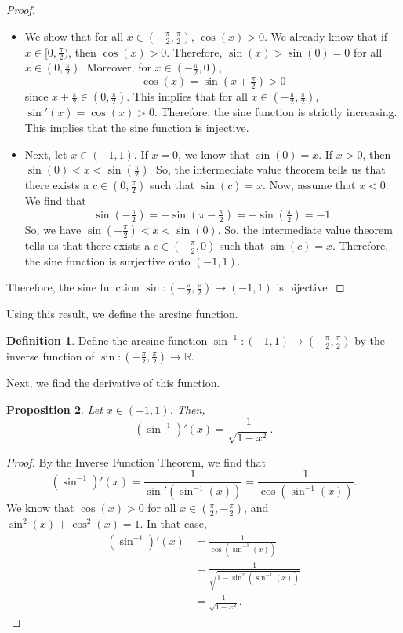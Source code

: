 \documentclass[a4paper, openany]{memoir}
\theoremstyle{definition}
\newtheorem{definition}{Definition}[section]
\theoremstyle{plain}
\newtheorem{proposition}[definition]{Proposition}
\begin{document}
\begin{proof}
\hspace*{0pt}
\begin{itemize}
    \item We show that for all $x \in (-\frac{\pi}{2}, \frac{\pi}{2})$, $\cos(x) > 0$. We already know that if $x \in [0, \frac{\pi}{2})$, then $\cos (x) > 0$. Therefore, $\sin(x) > \sin(0) = 0$ for all $x \in (0, \frac{\pi}{2})$. Moreover, for $x \in (-\frac{\pi}{2}, 0)$,
    \[\cos (x) = \sin(x + \tfrac{\pi}{2}) > 0\]
    since $x + \frac{\pi}{2} \in (0, \frac{\pi}{2})$. This implies that for all $x \in (-\frac{\pi}{2}, \frac{\pi}{2})$, $\sin'(x) = \cos (x) > 0$. Therefore, the sine function is strictly increasing. This implies that the sine function is injective.
    
    \item Next, let $x \in (-1, 1)$. If $x = 0$, we know that $\sin(0) = x$. If $x > 0$, then $\sin(0) < x < \sin(\frac{\pi}{2})$. So, the intermediate value theorem tells us that there exists a $c \in (0, \frac{\pi}{2})$ such that $\sin(c) = x$. Now, assume that $x < 0$. We find that
    \[\sin(-\tfrac{\pi}{2}) = -\sin(\pi - \tfrac{\pi}{2}) = -\sin(\tfrac{\pi}{2}) = -1.\]
    So, we have $\sin(-\frac{\pi}{2}) < x < \sin(0)$. So, the intermediate value theorem tells us that there exists a $c \in (-\frac{\pi}{2}, 0)$ such that $\sin(c) = x$. Therefore, the sine function is surjective onto $(-1, 1)$.
\end{itemize}
Therefore, the sine function $\sin: (-\frac{\pi}{2}, \frac{\pi}{2}) \to (-1, 1)$ is bijective.
\end{proof}
\noindent Using this result, we define the arcsine function.
\begin{definition}
Define the arcsine function $\sin^{-1}: (-1, 1) \to (-\frac{\pi}{2}, \frac{\pi}{2})$ by the inverse function of $\sin: (-\frac{\pi}{2}, \frac{\pi}{2}) \to \mathbb{R}$.
\end{definition}
\noindent Next, we find the derivative of this function.
\begin{proposition}
Let $x \in (-1, 1)$. Then,
\[(\sin^{-1})'(x) = \frac{1}{\sqrt{1 - x^2}}.\]
\end{proposition}
\begin{proof}
By the Inverse Function Theorem, we find that
\[(\sin^{-1})'(x) = \frac{1}{\sin'(\sin^{-1}(x))} = \frac{1}{\cos(\sin^{-1}(x))}.\]
We know that $\cos(x) > 0$ for all $x \in (\frac{\pi}{2}, -\frac{\pi}{2})$, and $\sin^2 (x) + \cos^2 (x) = 1$. In that case,
\begin{align*}
    (\sin^{-1})'(x) &= \frac{1}{\cos(\sin^{-1}(x))} \\
    &= \frac{1}{\sqrt{1 - \sin^2(\sin^{-1}(x))}} \\
    &= \frac{1}{\sqrt{1 - x^2}}.
\end{align*}
\end{proof}
\end{document}

